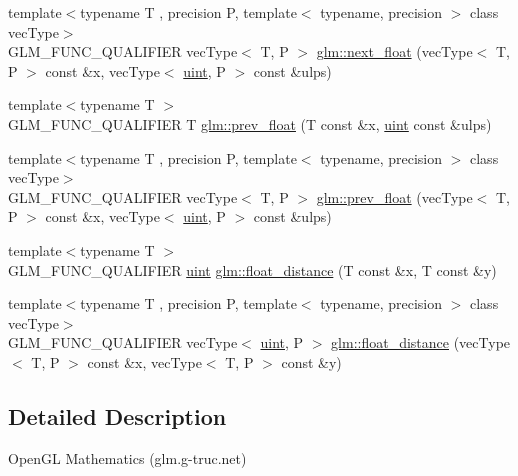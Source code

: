 \begin{DoxyCompactItemize}
\item 
{\footnotesize template$<$typename T , precision P, template$<$ typename, precision $>$ class vec\+Type$>$ }\\G\+L\+M\+\_\+\+F\+U\+N\+C\+\_\+\+Q\+U\+A\+L\+I\+F\+I\+E\+R vec\+Type$<$ T, P $>$ \hyperlink{namespaceglm_a3ad10c60be0fa0e754c8064ca13c4b91}{glm\+::next\+\_\+float} (vec\+Type$<$ T, P $>$ const \&x, vec\+Type$<$ \hyperlink{stb__image_8c_a91ad9478d81a7aaf2593e8d9c3d06a14}{uint}, P $>$ const \&ulps)
\item 
{\footnotesize template$<$typename T $>$ }\\G\+L\+M\+\_\+\+F\+U\+N\+C\+\_\+\+Q\+U\+A\+L\+I\+F\+I\+E\+R T \hyperlink{namespaceglm_a87ac8f75510274e112fe8512cfaa6935}{glm\+::prev\+\_\+float} (T const \&x, \hyperlink{stb__image_8c_a91ad9478d81a7aaf2593e8d9c3d06a14}{uint} const \&ulps)
\item 
{\footnotesize template$<$typename T , precision P, template$<$ typename, precision $>$ class vec\+Type$>$ }\\G\+L\+M\+\_\+\+F\+U\+N\+C\+\_\+\+Q\+U\+A\+L\+I\+F\+I\+E\+R vec\+Type$<$ T, P $>$ \hyperlink{namespaceglm_a742d4d85c23906178d1fd0c9fbab266c}{glm\+::prev\+\_\+float} (vec\+Type$<$ T, P $>$ const \&x, vec\+Type$<$ \hyperlink{stb__image_8c_a91ad9478d81a7aaf2593e8d9c3d06a14}{uint}, P $>$ const \&ulps)
\item 
{\footnotesize template$<$typename T $>$ }\\G\+L\+M\+\_\+\+F\+U\+N\+C\+\_\+\+Q\+U\+A\+L\+I\+F\+I\+E\+R \hyperlink{stb__image_8c_a91ad9478d81a7aaf2593e8d9c3d06a14}{uint} \hyperlink{group__gtc__ulp_ga2e09bd6c8b0a9c91f6f5683d68245634}{glm\+::float\+\_\+distance} (T const \&x, T const \&y)
\item 
{\footnotesize template$<$typename T , precision P, template$<$ typename, precision $>$ class vec\+Type$>$ }\\G\+L\+M\+\_\+\+F\+U\+N\+C\+\_\+\+Q\+U\+A\+L\+I\+F\+I\+E\+R vec\+Type$<$ \hyperlink{stb__image_8c_a91ad9478d81a7aaf2593e8d9c3d06a14}{uint}, P $>$ \hyperlink{namespaceglm_a2e00104097b2f3967e97131933595309}{glm\+::float\+\_\+distance} (vec\+Type$<$ T, P $>$ const \&x, vec\+Type$<$ T, P $>$ const \&y)
\end{DoxyCompactItemize}


\subsection{Detailed Description}
Open\+G\+L Mathematics (glm.\+g-\/truc.\+net)

